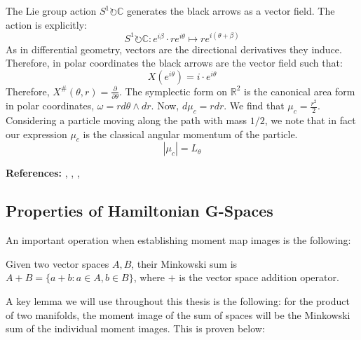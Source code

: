 \begin{example}
The Lie group action $S^1 \circlearrowright \mathbb{C}$ generates the black arrows as a vector field. The action is explicitly: 
\begin{equation}
S^1 \circlearrowright \mathbb{C}: e^{i\beta} \cdot re^{i\theta} \mapsto re^{i(\theta + \beta)}
\end{equation}
As in differential geometry, vectors are the directional derivatives they induce. Therefore, in polar coordinates the black arrows are the vector field such that:
\begin{equation}
X(e^{i\theta}) = i \cdot e^{i\theta}
\end{equation}
Therefore, $X^{\#}(\theta, r) = \frac{\partial}{\partial \theta}$. The symplectic form on $\mathbb{R}^2$ is the canonical area form in polar coordinates, $\omega = r d\theta \wedge dr$. Now, $d\mu_{c} = r dr$. We find that $\mu_{c} = \frac{r^2}{2}$. Considering a particle moving along the path with mass $1/2$, we note that in fact our expression $\mu_{c}$ is the classical angular momentum of the particle.
\begin{equation}
|\mu_{c}| = L_{\theta}
\end{equation}

\end{example}

\noindent \textbf{References:} \textcite{Terek2020}, \textcite{Bjorn2018}, \textcite{Arnold2010}, \textcite{Silva2001}

\subsection{Properties of Hamiltonian G-Spaces}

An important operation when establishing moment map images is the following:

\begin{defn}
Given two vector spaces $A, B$, their Minkowski sum is $A + B = \{a + b: a \in A, b \in B \}$, where $+$ is the vector space addition operator.
\end{defn}

\begin{remark}
A key lemma we will use throughout this thesis is the following: for the product of two manifolds, the moment image of the sum of spaces will be the Minkowski sum of the individual moment images. This is proven below:
\end{remark} 

